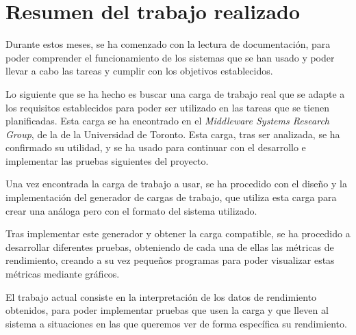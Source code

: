 









\chapter*{Resumen del trabajo realizado}

Durante estos meses, se ha comenzado con la lectura de documentación, para poder comprender
el funcionamiento de los sistemas que se han usado y poder llevar a cabo las tareas y cumplir
con los objetivos establecidos.

Lo siguiente que se ha hecho es buscar una carga de trabajo real que se adapte a los requisitos
establecidos para poder ser utilizado en las tareas que se tienen planificadas. Esta carga
se ha encontrado en el \textit{Middleware Systems Research Group},
de la de la Universidad de Toronto. Esta carga, tras ser analizada, se ha confirmado su utilidad,
y se ha usado para continuar con el desarrollo e implementar las pruebas siguientes del proyecto.

Una vez encontrada la carga de trabajo a usar, se ha procedido con el diseño y la implementación del
generador de cargas de trabajo, que utiliza esta carga para crear una análoga pero con el formato
del sistema utilizado.

Tras implementar este generador y obtener la carga compatible, se ha procedido a desarrollar diferentes
pruebas, obteniendo de cada una de ellas las métricas de rendimiento, creando a su vez pequeños
programas para poder visualizar estas métricas mediante gráficos.

El trabajo actual consiste en la interpretación de los datos de rendimiento obtenidos, para poder
implementar pruebas que usen la carga y que lleven al sistema a situaciones en las que queremos ver
de forma específica su rendimiento.

